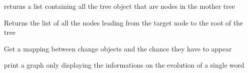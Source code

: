 \documentclass[letterpaper,10pt,english]{sphinxmanual}
\begin{document}
\begin{fulllineitems}

\begin{fulllineitems}
\label{\detokenize{index:Tree.L_tree.get_nodes}}
\sphinxAtStartPar
returns a list containing all the tree object that are nodes in the mother tree

\end{fulllineitems}


\begin{fulllineitems}
\label{\detokenize{index:Tree.L_tree.get_path_to_root}}
\sphinxAtStartPar
Returns the list of all the nodes leading from the target node to the root of the tree

\end{fulllineitems}


\begin{fulllineitems}
\label{\detokenize{index:Tree.L_tree.get_scores}}
\sphinxAtStartPar
Get a mapping between change objects and the chance they have to appear

\end{fulllineitems}


\begin{fulllineitems}
\label{\detokenize{index:Tree.L_tree.history_to_graph}}
\sphinxAtStartPar
print a graph only displaying the informations on the evolution of a single word

\end{fulllineitems}



\end{fulllineitems}
\end{document}
